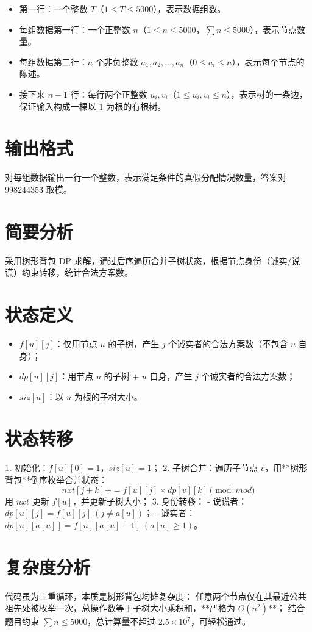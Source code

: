 \documentclass[11pt,a4paper,twocolumn]{ctexart}  %
\begin{document}
\begin{itemize}
    \item 第一行：一个整数 $T$（$1 \le T \le 5000$），表示数据组数。
    \item 每组数据第一行：一个正整数 $n$（$1 \le n \le 5000$，$\sum n \le 5000$），表示节点数量。
    \item 每组数据第二行：$n$ 个非负整数 $a_1, a_2, \dots, a_n$（$0 \le a_i \le n$），表示每个节点的陈述。
    \item 接下来 $n-1$ 行：每行两个正整数 $u_i, v_i$（$1 \le u_i, v_i \le n$），表示树的一条边，保证输入构成一棵以 $1$ 为根的有根树。
\end{itemize}

\section*{输出格式}
对每组数据输出一行一个整数，表示满足条件的真假分配情况数量，答案对 $998244353$ 取模。


\section*{简要分析}
采用树形背包 DP 求解，通过后序遍历合并子树状态，根据节点身份（诚实/说谎）约束转移，统计合法方案数。

\section*{状态定义}
\begin{itemize}
    \item $f[u][j]$：仅用节点 $u$ 的子树，产生 $j$ 个诚实者的合法方案数（不包含 $u$ 自身）；
    \item $dp[u][j]$：用节点 $u$ 的子树 + $u$ 自身，产生 $j$ 个诚实者的合法方案数；
    \item $siz[u]$：以 $u$ 为根的子树大小。
\end{itemize}

\section*{状态转移}
1. 初始化：$f[u][0] = 1$，$siz[u] = 1$；
2. 子树合并：遍历子节点 $v$，用**树形背包**倒序枚举合并状态：
   $$nxt[j+k] += f[u][j] \times dp[v][k] \pmod{mod}$$
   用 $nxt$ 更新 $f[u]$，并更新子树大小；
3. 身份转移：
   - 说谎者：$dp[u][j] = f[u][j] \ (j \neq a[u])$；
   - 诚实者：$dp[u][a[u]] = f[u][a[u]-1] \ (a[u] \ge 1)$。

\section*{复杂度分析}
代码虽为三重循环，本质是树形背包均摊复杂度：
任意两个节点仅在其最近公共祖先处被枚举一次，总操作数等于子树大小乘积和，**严格为 $O(n^2)$**；
结合题目约束 $\sum n \le 5000$，总计算量不超过 $2.5 \times 10^7$，可轻松通过。
\end{document}
